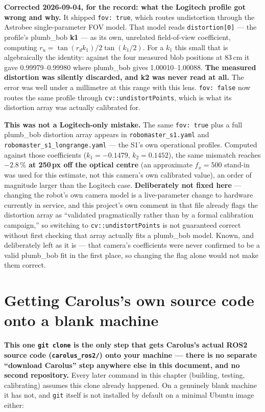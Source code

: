 \documentclass[11pt]{report}
\begin{document}
\textbf{Corrected 2026-09-04, for the record: what the Logitech profile
got wrong and why.} It shipped \texttt{fov: true}, which routes undistortion
through the Astrobee single-parameter FOV model. That model reads
\texttt{distortion[0]} --- the profile's plumb\_bob \textbf{k1} --- as its
own, unrelated field-of-view coefficient, computing
$r_u = \tan(r_d k_1) / 2\tan(k_1/2)$. For a $k_1$ this small that is
algebraically the identity: against the four measured blob positions at
83\,cm it gave 0.99979--0.99980 where plumb\_bob gives 1.00010--1.00088.
\textbf{The measured distortion was silently discarded, and k2 was never
read at all.} The error was well under a millimetre at this range with this
lens. \texttt{fov: false} now routes the same profile through
\texttt{cv::undistortPoints}, which is what its distortion array was
actually calibrated for.

\textbf{This was not a Logitech-only mistake.} The same \texttt{fov: true}
plus a full plumb\_bob distortion array appears in \texttt{robomaster\_s1.yaml}
and \texttt{robomaster\_s1\_longrange.yaml} --- the S1's own operational
profiles. Computed against those coefficients ($k_1=-0.1479$,
$k_2=0.1452$), the same mismatch reaches \textbf{$-2.8\,\%$ at 250\,px off
the optical centre} (an approximate $f_x=500$ stand-in was used for this
estimate, not this camera's own calibrated value), an order of magnitude
larger than the Logitech case. \textbf{Deliberately not fixed here} ---
changing the robot's own camera model is a live-parameter change to
hardware currently in service, and this project's own comment in that file
already flags the distortion array as ``validated pragmatically rather than
by a formal calibration campaign,'' so switching to \texttt{cv::undistortPoints}
is not guaranteed correct without first checking that array actually fits a
plumb\_bob model. Known, and deliberately left as it is --- that camera's
coefficients were never confirmed to be a valid plumb\_bob fit in the first
place, so changing the flag alone would not make them correct.


\section{Getting Carolus's own source code onto a blank machine}
\label{sec:ros2-onto-blank-machine}

\textbf{This one \texttt{git clone} is the only step that gets Carolus's
actual ROS2 source code (\texttt{carolus\_ros2/}) onto your machine ---
there is no separate ``download Carolus'' step anywhere else in this
document, and no second repository.} Every later command in this chapter
(building, testing, calibrating) assumes this clone already happened.
On a genuinely blank machine it has not, and \texttt{git} itself is not
installed by default on a minimal Ubuntu image either:
\end{document}
